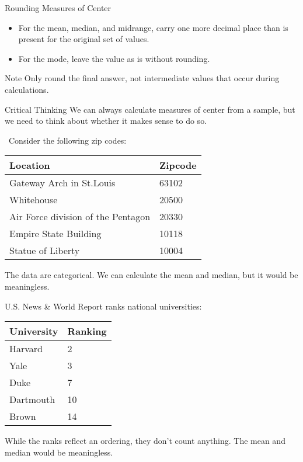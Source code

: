 \documentclass{beamer}
\begin{document}
\begin{frame}
\begin{block}{Rounding Measures of Center}
\begin{itemize}
\item For the mean, median, and midrange, carry one more decimal place than is present for the original set of values.
\item For the mode, leave the value as is without rounding.
\end{itemize}
\end{block}\pause

\begin{block}{Note}
Only round the final answer, not intermediate values that occur during calculations.
\end{block}\pause

\begin{block}{Critical Thinking}
We can always calculate measures of center from a sample, but we need to think about whether it makes sense to do so.
\end{block}
\end{frame}

\begin{frame}
\begin{example}\
Consider the following zip codes:
\begin{center}
\begin{tabular}{|l|l|}\hline
\textbf{Location} & \textbf{Zipcode} \\\hline
Gateway Arch in St.\@ Louis & 63102 \\
Whitehouse & 20500 \\
Air Force division of the Pentagon & 20330 \\
Empire State Building & 10118 \\
Statue of Liberty & 10004 \\\hline
\end{tabular}
\end{center}\pause

The data are categorical. We can calculate the mean and median, but it would be meaningless.
\end{example}
\end{frame}

\begin{frame}
\begin{example}
U.S. News \& World Report ranks national universities:
\begin{center}
\begin{tabular}{|l|l|}\hline
\textbf{University} & \textbf{Ranking} \\\hline
Harvard & 2 \\
Yale & 3 \\
Duke & 7 \\
Dartmouth & 10 \\
Brown & 14 \\\hline
\end{tabular}
\end{center}\pause

While the ranks reflect an ordering, they don't count anything. The mean and median would be meaningless.
\end{example}
\end{frame}
\end{document}

